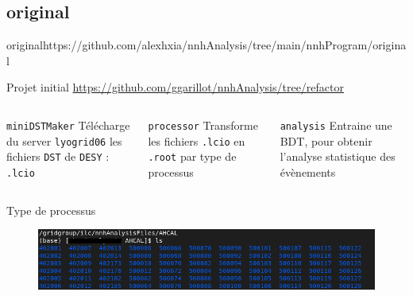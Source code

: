 \documentclass[9pt]{beamer}
\begin{document}


\subsection{original}

\begin{frame}{original}{https://github.com/alexhxia/nnhAnalysis/tree/main/nnhProgram/original}

\begin{block}{Projet initial}
	\url{https://github.com/ggarillot/nnhAnalysis/tree/refactor}
\end{block}

\begin{columns}

	\begin{column}{0.33\textwidth}
		\begin{block}{\texttt{miniDSTMaker}}
			Télécharge du server \texttt{lyogrid06} les fichiers \texttt{DST} de \texttt{DESY} : \texttt{.lcio}
		\end{block}
	\end{column}
	
	\begin{column}{0.33\textwidth}
		\begin{block}{\texttt{processor}}
			Transforme les fichiers \texttt{.lcio} en \texttt{.root} par type de processus
		\end{block}
	\end{column}
	
	\begin{column}{0.33\textwidth}
		\begin{block}{\texttt{analysis}}
			Entraine une BDT, pour obtenir l'analyse statistique des évènements
		\end{block}
	\end{column}

\end{columns}

\begin{block}{Type de processus}
	\begin{figure}
		\center
		\includegraphics[width=\textwidth]{../img/listeProcessus.png} 
	\end{figure}
\end{block}

\end{frame}
\end{document}
